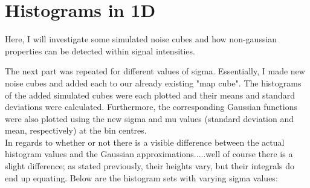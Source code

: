 \documentclass{article}
\begin{document}
\begin{enumerate}
\end{enumerate}
    
\section{Histograms in 1D}
Here, I will investigate some simulated noise cubes and how non-gaussian properties can be detected within signal intensities. 

\[\]
The next part was repeated for different values of sigma. Essentially, I made new noise cubes and added each to our already existing "map cube". The histograms of the added simulated cubes were each plotted and their means and standard deviations were calculated. Furthermore, the corresponding Gaussian functions were also plotted using the new sigma and mu values (standard deviation and mean, respectively) at the bin centres.
\[\]
In regards to whether or not there is a visible difference between the actual histogram values and the Gaussian approximations.....well of course there is a slight difference; as stated previously, their heights vary, but their integrals do end up equating. Below are the histogram sets with varying sigma values:
\end{document}
